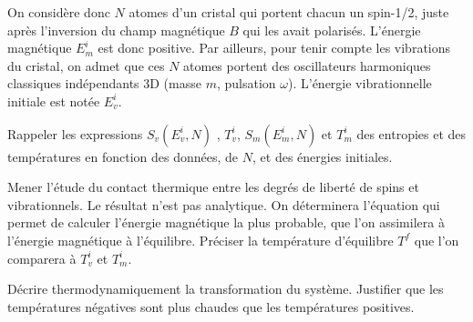 \documentclass[utf8, 11pt]{feuille}
\begin{document}
On considère donc $N$ atomes d'un cristal qui portent chacun un spin-1/2, juste après l'inversion du champ magnétique $B$ qui les avait polarisés. L'énergie magnétique $E_m^i$ est donc positive. Par ailleurs, pour tenir compte les vibrations du cristal, on admet que ces $N$ atomes  portent des oscillateurs harmoniques classiques indépendants 3D (masse $m$, pulsation $\omega$). L'énergie vibrationnelle initiale est notée $E_v^i$.

\question
Rappeler les expressions $S_v(E_v^i,N)$ , $T_v^i$, $S_m(E_m^i,N)$ et $T_m^i$ des entropies et des températures en fonction des données, de $N$, et des énergies initiales.

\question
Mener l'étude du contact thermique entre les degrés de liberté de spins et vibrationnels. Le résultat n'est pas analytique. On déterminera l'équation qui permet de calculer l'énergie magnétique la plus probable, que l'on assimilera à l'énergie magnétique à l'équilibre. Préciser la température d'équilibre $T^f$ que l'on comparera à $T^i_v$ et $T_m^i$.

\question
Décrire thermodynamiquement la transformation du système. Justifier que les températures négatives sont plus chaudes que les températures positives.
\end{document}
